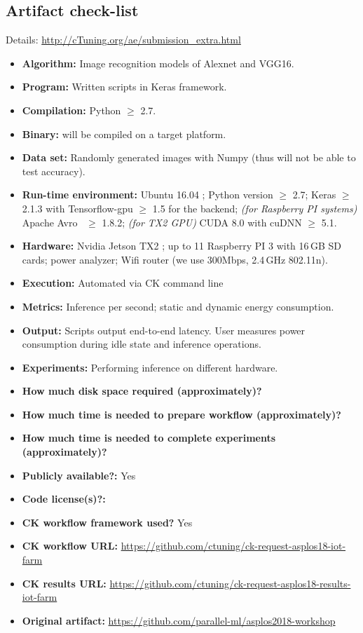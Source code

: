 \documentclass[sigplan]{acmart}
\begin{document}
\subsection{Artifact check-list}

Details: \url{http://cTuning.org/ae/submission_extra.html}

\begin{itemize}
  \item {\bf Algorithm:} Image recognition models of Alexnet and VGG16.
  \item {\bf Program:} Written scripts in Keras framework.
  \item {\bf Compilation:} Python $\geq$ 2.7.
  \item {\bf Binary:} will be compiled on a target platform.
  \item {\bf Data set:} Randomly generated images with Numpy (thus will not be able to test accuracy).
  \item {\bf Run-time environment:} Ubuntu 16.04 ; Python version $\geq$ 2.7; Keras $\geq$ 2.1.3 with Tensorflow-gpu $\geq$ 1.5 for the backend; \emph{(for Raspberry PI systems)} Apache Avro~\cite{apache} $\geq$ 1.8.2; \emph{(for TX2 GPU)} CUDA 8.0 with cuDNN $\geq$ 5.1.
  \item {\bf Hardware:} Nvidia Jetson TX2 ; up to 11 Raspberry PI 3 with 16\,GB SD cards; power analyzer; Wifi router (we use 300Mbps, 2.4\,GHz 802.11n).
  \item {\bf Execution:} Automated via CK command line
  \item {\bf Metrics:} Inference per second; static and dynamic energy consumption.
  \item {\bf Output:} Scripts output end-to-end latency. User measures power consumption during idle state and inference operations.
  \item {\bf Experiments:} Performing inference on different hardware.
  \item {\bf How much disk space required (approximately)?}
  \item {\bf How much time is needed to prepare workflow (approximately)?}
  \item {\bf How much time is needed to complete experiments (approximately)?}
  \item {\bf Publicly available?:} Yes
  \item {\bf Code license(s)?:} 
  \item {\bf CK workflow framework used?} Yes
  \item {\bf CK workflow URL:} \url{https://github.com/ctuning/ck-request-asplos18-iot-farm}
  \item {\bf CK results URL:} \url{https://github.com/ctuning/ck-request-asplos18-results-iot-farm}
  \item {\bf Original artifact:} \url{https://github.com/parallel-ml/asplos2018-workshop}

\end{itemize}
\end{document}
